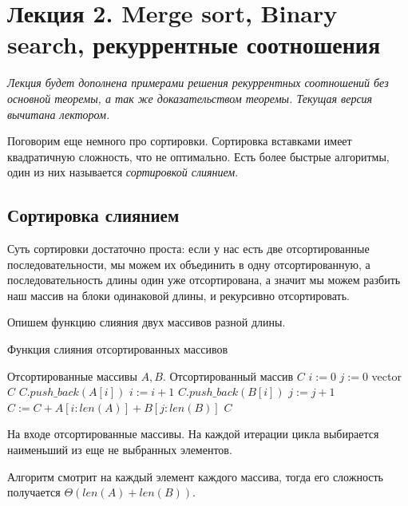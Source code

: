 \documentclass[../main.tex]{subfiles}
\begin{document}
	\section{Лекция 2. Merge sort, Binary search, рекуррентные соотношения}
	
	\textit{Лекция будет дополнена примерами решения рекуррентных соотношений без основной теоремы, а так же доказательством теоремы. Текущая версия вычитана лектором.}

	Поговорим еще немного про сортировки. Сортировка вставками имеет квадратичную сложность, что не оптимально. Есть более быстрые алгоритмы, один из них называется \textit{сортировкой слиянием}.
	
	\subsection{Сортировка слиянием}
	
	Суть сортировки достаточно проста: если у нас есть две отсортированные последовательности, мы можем их объединить в одну отсортированную, а последовательность длины один уже отсортирована, а значит мы можем разбить наш массив на блоки одинаковой длины, и рекурсивно отсортировать.
	
	
	Опишем функцию слияния двух массивов разной длины.
	\begin{algorithm}[H]
		\caption{Функция слияния отсортированных массивов}
		\begin{algorithmic}[1]
			\Require Отсортированные массивы $A, B$.
			\Ensure Отсортированный массив $C$
				\State $ i := 0 $
				\State $ j := 0 $
				\State vector $C$
						\State $C.push\_back(A[i])$
						\State $i := i + 1$
					\Else
						\State $C.push\_back(B[i])$
						\State $j := j + 1$
					\EndIf
				\EndWhile
				\State $ C := C + A[i:len(A)] + B[j:len(B)]$
				\State \Return $C$
			\EndFunction
		\end{algorithmic}
	\end{algorithm}

		
	\begin{proof_cor}
		На входе отсортированные массивы. На каждой итерации цикла выбирается наименьший из еще не выбранных элементов.
	\end{proof_cor}
	\begin{time}
		Алгоритм смотрит на каждый элемент каждого массива, тогда его сложность получается $\Theta(len(A) + len(B))$.
	\end{time}	
\end{document}
